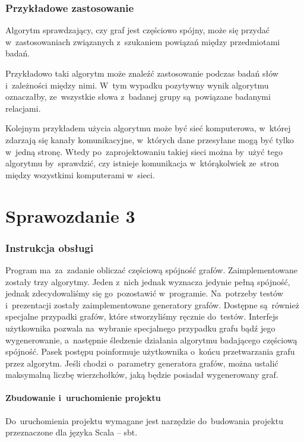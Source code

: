 \documentclass[a4paper,12pt]{mwart}
\begin{document}
\section{Przykładowe zastosowanie}

Algorytm sprawdzający, czy graf jest częściowo spójny, może się przydać
w~zastosowaniach związanych z~szukaniem powiązań między przedmiotami badań.

Przykładowo taki algorytm może znaleźć zastosowanie podczas badań słów
i~zależności między nimi. W~tym wypadku pozytywny wynik algorytmu oznaczałby,
ze~wszystkie słowa z~badanej grupy są~powiązane badanymi relacjami.

Kolejnym przykładem użycia algorytmu może być sieć komputerowa, w~której
zdarzają się kanały komunikacyjne, w~których dane przesyłane mogą być tylko
w~jedną stronę. Wtedy po~zaprojektowaniu takiej sieci można by~użyć tego
algorytmu by~sprawdzić, czy istnieje komunikacja w~którąkolwiek ze~stron między
wszystkimi komputerami w~sieci.

\newpage

\part{Sprawozdanie 3}

\section{Instrukcja obsługi}

Program ma~za~zadanie obliczać częściową spójność grafów. Zaimplementowane
zostały trzy algorytmy. Jeden z~nich jednak wyznacza jedynie pełną spójność,
jednak zdecydowaliśmy się go~pozostawić w~programie. Na~potrzeby testów
i~prezentacji zostały zaimplementowane generatory grafów. Dostępne są~również
specjalne przypadki grafów, które stworzyliśmy ręcznie do~testów. Interfejs
użytkownika pozwala na~wybranie specjalnego przypadku grafu bądź jego
wygenerowanie, a~następnie śledzenie działania algorytmu badającego częściową
spójność. Pasek postępu poinformuje użytkownika o~końcu przetwarzania grafu
przez algorytm. Jeśli chodzi o~parametry generatora grafów, można ustalić
maksymalną liczbę wierzchołków, jaką będzie posiadał wygenerowany graf.

\subsection{Zbudowanie i~uruchomienie projektu}

Do~uruchomienia projektu wymagane jest narzędzie do~budowania projektu
przeznaczone dla języka Scala -- sbt.
\end{document}
